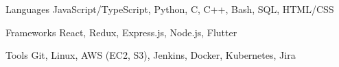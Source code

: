 

\begin{cvskills}

  \cvskill
    {Languages} %
    {JavaScript/TypeScript, Python, C, C++, Bash, SQL, HTML/CSS} %

  \cvskill
    {Frameworks} %
    {React, Redux, Express.js, Node.js, Flutter} %

  \cvskill
    {Tools} %
    {Git, Linux, AWS (EC2, S3), Jenkins, Docker, Kubernetes, Jira} %

\end{cvskills}
